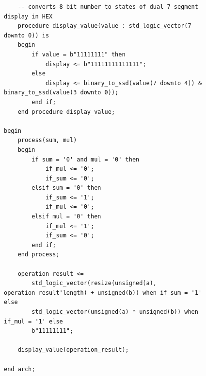 \documentclass{article}
\begin{document}
\begin{figure}
\begin{adjustwidth}{-1.3in}{-.7in} 
\centering
\begin{verbatim}
    -- converts 8 bit number to states of dual 7 segment display in HEX
    procedure display_value(value : std_logic_vector(7 downto 0)) is
    begin
        if value = b"11111111" then
            display <= b"11111111111111";
        else
            display <= binary_to_ssd(value(7 downto 4)) & binary_to_ssd(value(3 downto 0));
        end if;
    end procedure display_value;
    
begin
    process(sum, mul)
    begin
        if sum = '0' and mul = '0' then
            if_mul <= '0';
            if_sum <= '0';
        elsif sum = '0' then
            if_sum <= '1';
            if_mul <= '0';
        elsif mul = '0' then
            if_mul <= '1';
            if_sum <= '0';
        end if;
    end process;

    operation_result <= 
        std_logic_vector(resize(unsigned(a), operation_result'length) + unsigned(b)) when if_sum = '1' else
        std_logic_vector(unsigned(a) * unsigned(b)) when if_mul = '1' else
        b"11111111";
    
    display_value(operation_result);
    
end arch;

\end{verbatim}
\end{adjustwidth}
\end{figure}
\end{document}
